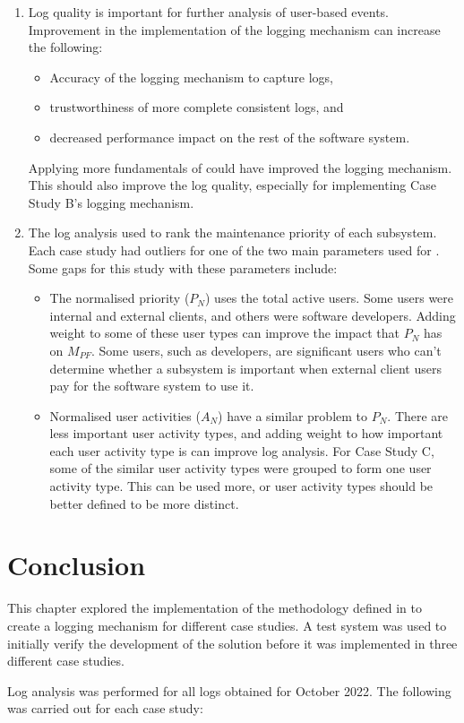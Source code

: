 \begin{enumerate}
	\item Log quality is important for further analysis of user-based events. Improvement in the implementation of the logging mechanism can increase the following:
		\begin{itemize}
			\item Accuracy of the logging mechanism to capture logs,
			\item trustworthiness of more complete consistent logs, and
			\item decreased performance impact on the rest of the software system.
		\end{itemize}
	Applying more fundamentals of  could have improved the logging mechanism. This should also improve the log quality, especially for implementing Case Study B's logging mechanism.
	\item The log analysis used  to rank the maintenance priority of each subsystem. Each case study had outliers for one of the two main parameters used for . Some gaps for this study with these parameters include:
		\begin{itemize}
			\item The normalised priority ($P_N$) uses the total active users. Some users were internal and external clients, and others were software developers. Adding weight to some of these user types can improve the impact that $P_N$ has on $M_{PF}$. Some users, such as developers, are significant users who can't determine whether a subsystem is important when external client users pay for the software system to use it.
			\item Normalised user activities ($A_N$) have a similar problem to $P_N$. There are less important user activity types, and adding weight to how important each user activity type is can improve log analysis. For Case Study C, some of the similar user activity types were grouped to form one user activity type. This can be used more, or user activity types should be better defined to be more distinct.
		\end{itemize}
\end{enumerate}

\section{Conclusion}
This chapter explored the implementation of the methodology defined in  to create a logging mechanism for different case studies. A test system was used to initially verify the development of the solution before it was implemented in three different case studies. \par Log analysis was performed for all logs obtained for October 2022. The following was carried out for each case study:

